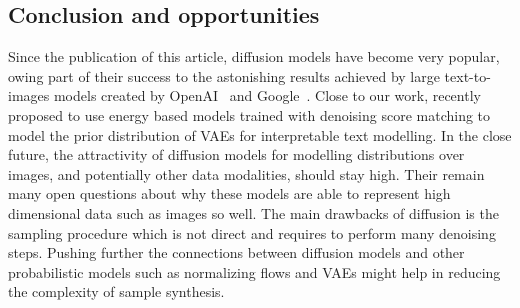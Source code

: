 \subsection{Conclusion and opportunities}
Since the publication of this article, diffusion models have become very popular, owing part of their success to the astonishing results achieved by large text-to-images models created by OpenAI~\citep[$\text{DALL}\cdot\text{E} 2$][]{ramesh2022hierarchical} and Google~\citep[Imagen][]{saharia2022photorealistic}. Close to our work, \citet{yu2022latent} recently proposed to use energy based models trained with denoising score matching to model the prior distribution of VAEs for interpretable text modelling. In the close future, the attractivity of diffusion models for modelling distributions over images, and potentially other data modalities, should stay high. Their remain many open questions about why these models are able to represent high dimensional data such as images so well. The main drawbacks of diffusion is the sampling procedure which is not direct and requires to perform many denoising steps. Pushing further the connections between diffusion models and other probabilistic models such as normalizing flows and VAEs might help in reducing the complexity of sample synthesis.

